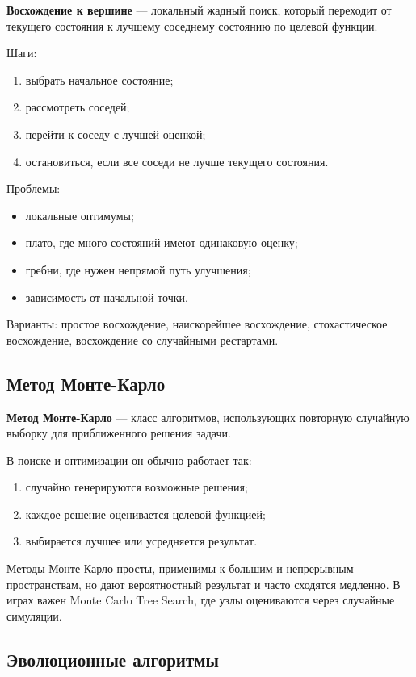 \textbf{Восхождение к вершине} --- локальный жадный поиск, который переходит от текущего состояния к лучшему соседнему состоянию по целевой функции.

Шаги:
\begin{enumerate}
    \item выбрать начальное состояние;
    \item рассмотреть соседей;
    \item перейти к соседу с лучшей оценкой;
    \item остановиться, если все соседи не лучше текущего состояния.
\end{enumerate}

Проблемы:
\begin{itemize}
    \item локальные оптимумы;
    \item плато, где много состояний имеют одинаковую оценку;
    \item гребни, где нужен непрямой путь улучшения;
    \item зависимость от начальной точки.
\end{itemize}

Варианты: простое восхождение, наискорейшее восхождение, стохастическое восхождение, восхождение со случайными рестартами.

\subsection*{Метод Монте-Карло}

\textbf{Метод Монте-Карло} --- класс алгоритмов, использующих повторную случайную выборку для приближенного решения задачи.

В поиске и оптимизации он обычно работает так:
\begin{enumerate}
    \item случайно генерируются возможные решения;
    \item каждое решение оценивается целевой функцией;
    \item выбирается лучшее или усредняется результат.
\end{enumerate}

Методы Монте-Карло просты, применимы к большим и непрерывным пространствам, но дают вероятностный результат и часто сходятся медленно. В играх важен Monte Carlo Tree Search, где узлы оцениваются через случайные симуляции.

\subsection*{Эволюционные алгоритмы}

